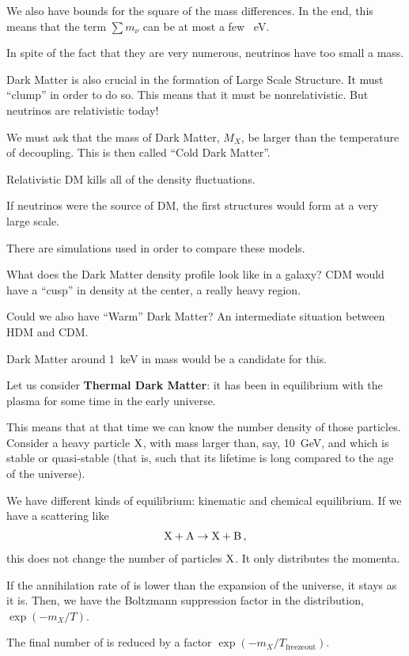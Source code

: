 \documentclass[main.tex]{subfiles}
\begin{document}
We also have bounds for the square of the mass differences. 
In the end, this means that the term \(\sum m_{\nu }\) can be at most a few \SI{}{eV}.

In spite of the fact that they are very numerous, neutrinos have too small a mass. 

Dark Matter is also crucial in the formation of Large Scale Structure.
It must ``clump'' in order to do so. This means that it must be nonrelativistic.  But neutrinos are relativistic today! 

We must ask that the mass of Dark Matter, \(M_X\), be larger than the temperature of decoupling. This is then called ``Cold Dark Matter''.

Relativistic DM kills all of the density fluctuations. 

If neutrinos were the source of DM, the first structures would form at a very large scale. 

There are simulations used in order to compare these models.

What does the Dark Matter density profile look like in a galaxy? 
CDM would have a ``cusp'' in density at the center, a really heavy region. 

Could we also have ``Warm'' Dark Matter? An intermediate situation between HDM and CDM. 

Dark Matter around \SI{1}{keV} in mass would be a candidate for this. 

Let us consider \textbf{Thermal Dark Matter}: it has been in equilibrium with the plasma for some time in the early universe.

This means that at that time we can know the number density of those particles. 
Consider a heavy particle \(\ce{X}\), with mass larger than, say, \SI{10}{GeV}, and which is stable or quasi-stable (that is, such that its lifetime is long compared to the age of the universe).

We have different kinds of equilibrium: kinematic and chemical equilibrium. If we have a scattering like 
%
\begin{align}
\ce{X} + \ce{A} \to \ce{X} + \ce{B}
\,,
\end{align}
%
this does not change the number of particles \(\ce{X}\). It only distributes the momenta. 

If the annihilation rate of  is lower than the expansion of the universe, it stays as it is. 
Then, we have the Boltzmann suppression factor in the distribution, \(\exp(- m_X / T)\). 

The final number of  is reduced by a factor \(\exp(- m_X / T _{\text{freezeout}})\).
\end{document}
